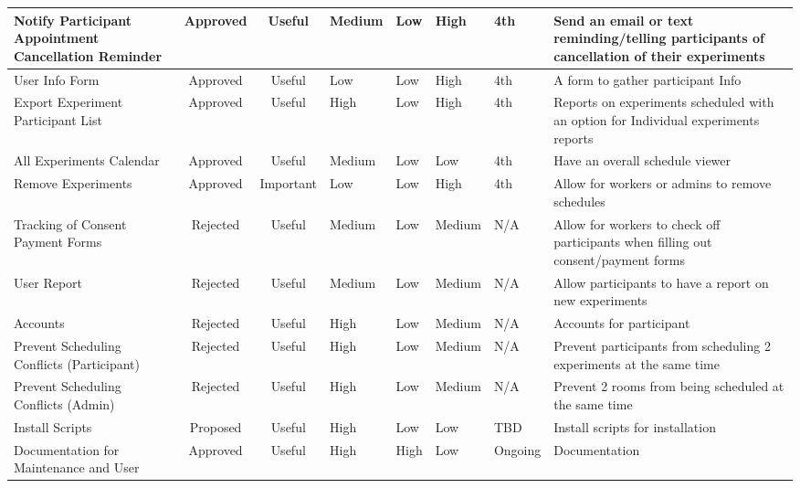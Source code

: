 \begin{table}[!h]
\begin{tabular}{|p{2.5cm}|c|c|p{1.25cm}|p{1cm}|p{1.25cm}|p{1cm}|p{3.75cm}|}
        \hline
         Notify Participant Appointment Cancellation Reminder & Approved & Useful & Medium & Low & High & 4th & Send an email or text reminding/telling participants of cancellation of their experiments \\
        \hline
        User Info Form & Approved & Useful & Low & Low & High & 4th & A form to gather participant Info \\
        \hline
        Export Experiment Participant List & Approved & Useful & High & Low & High & 4th & Reports on experiments scheduled with an option for Individual experiments reports \\
        \hline
        All Experiments Calendar & Approved & Useful & Medium & Low & Low & 4th & Have an overall schedule viewer \\
        \hline
        Remove Experiments & Approved & Important & Low & Low & High & 4th & Allow for workers or admins to remove schedules \\
        \hline
        Tracking of Consent Payment Forms & Rejected & Useful & Medium & Low & Medium & N/A & Allow for workers to check off participants when filling out consent/payment forms \\
        \hline
        User Report & Rejected & Useful & Medium & Low & Medium & N/A & Allow participants to have a report on new experiments \\
        \hline
        Accounts & Rejected & Useful & High & Low & Medium & N/A & Accounts for participant \\
        \hline
        Prevent Scheduling Conflicts (Participant) & Rejected & Useful & High & Low & Medium & N/A & Prevent participants from scheduling 2 experiments at the same time \\
        \hline
        Prevent Scheduling Conflicts (Admin) & Rejected & Useful & High & Low & Medium & N/A & Prevent 2 rooms from being scheduled at the same time \\
        \hline
        Install Scripts & Proposed & Useful & High & Low & Low & TBD & Install scripts for installation \\
        \hline
        Documentation for Maintenance and User & Approved & Useful & High & High & Low & Ongoing & Documentation \\
        \hline
    \end{tabular}
\end{table}
\clearpage
